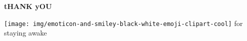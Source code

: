 \documentclass[12pt]{beamer}
\begin{document}
\begin{frame}
\frametitle{}
\begin{center}
	\textbf{{\Huge tHANK yOU}}
\end{center}
\begin{center}
	\texttt{[image: img/emoticon-and-smiley-black-white-emoji-clipart-cool]}
	{\Large for staying awake}
\end{center}

\end{frame}
\end{document}
